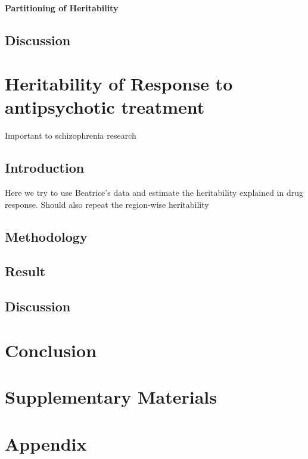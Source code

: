 \documentclass[12pt]{book}
\newcommand{\beginsupplement}{%
	\setcounter{table}{0}
	\renewcommand{\thetable}{S\arabic{table}}%
	\setcounter{figure}{0}
	\renewcommand{\thefigure}{S\arabic{figure}}%
}
\begin{document}
	
	
	
	\subsubsection{Partitioning of Heritability}
	
	\section{Discussion}
	\chapter{Heritability of Response to antipsychotic treatment}
	Important to schizophrenia research
	
	\section{Introduction}
	Here we try to use Beatrice's data and estimate the heritability explained in drug response.
	Should also repeat the region-wise heritability
	\section{Methodology}
	\section{Result}
	\section{Discussion}

	\chapter{Conclusion}
	
	
	
	
	
	
	
	
	\backmatter
	\printbibliography[heading=bibintoc,title={Bibliography}]
	\chapter*{Supplementary Materials}
	\beginsupplement
	\chapter*{Appendix}
\end{document}
